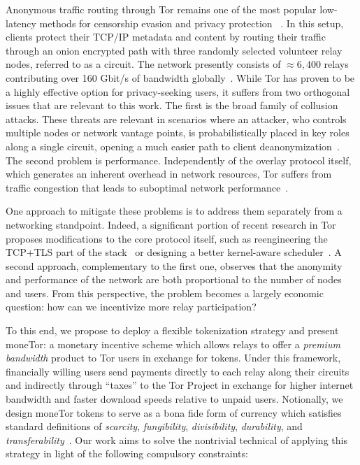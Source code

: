 Anonymous traffic routing through Tor remains one of the most popular
low-latency methods for censorship evasion and privacy protection
~\cite{dingledine2004tor}. In this setup, clients protect their TCP/IP
metadata and content by routing their traffic through an onion
encrypted path with three randomly selected volunteer relay nodes,
referred to as a circuit. The network presently consists of
$\approx 6,400$ relays contributing over 160 Gbit/s of bandwidth
globally~\cite{portal2018tormetrics}. While Tor has proven to be a
highly effective option for privacy-seeking users, it suffers from two
orthogonal issues that are relevant to this work. The first is the
broad family of collusion attacks. These threats are relevant in
scenarios where an attacker, who controls multiple nodes or network
vantage points, is probabilistically placed in key roles along a
single circuit, opening a much easier path to client
deanonymization~\cite{wright2004predecessor,murdoch2005low}. The
second problem is performance. Independently of the overlay protocol
itself, which generates an inherent overhead in network resources, Tor
suffers from  traffic congestion that leads to suboptimal
network performance~\cite{portal2018tormetrics,
  alsabah2016performance}.

One approach to mitigate these problems is to address them separately
from a networking standpoint. Indeed, a significant portion of recent
research in Tor proposes modifications to the core protocol itself,
such as reengineering the TCP+TLS part of the
stack~\cite{reardon2009improving} or designing a better kernel-aware
scheduler~\cite{jansen2014never}. A second approach, complementary to
the first one, observes that the anonymity and performance of the
network are both proportional to the number of nodes and users. From
this perspective, the problem becomes a largely economic question: how
can we incentivize more relay participation?

To this end, we propose to deploy a flexible tokenization strategy and present
moneTor: a monetary incentive scheme which allows relays to offer a
\emph{premium bandwidth} product to Tor users in exchange for tokens. Under this
framework, financially willing users send payments directly to each relay along
their circuits and indirectly through ``taxes'' to the Tor Project in exchange
for higher internet bandwidth and faster download speeds relative to unpaid
users. Notionally, we design moneTor tokens to serve as a bona fide form of
currency which satisfies standard definitions of \textit{scarcity},
\textit{fungibility}, \textit{divisibility}, \textit{durability}, and
\textit{transferability}~\cite[p.3]{crump2011phenomenon}. Our work aims to solve
the nontrivial technical of applying this strategy in light of the following
compulsory constraints:


